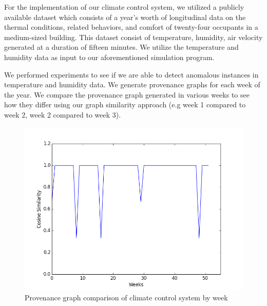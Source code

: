\par For the implementation of our climate control system, we utilized a publicly available dataset \cite{LANGEVIN201594} which consists of a year's worth of longitudinal data on the thermal conditions, related behaviors, and comfort of twenty-four occupants in a medium-sized building. This dataset consist of temperature, humidity, air velocity generated at  a duration of fifteen minutes. We utilize the temperature and humidity data as input to our aforementioned simulation program. \par We performed experiments to see if we are able to detect anomalous instances in temperature and humidity data. We generate provenance graphs for each week of the year. We compare the provenance graph generated in various weeks to see how they differ using our graph similarity approach (e.g week 1 compared to week 2, week 2 compared to week 3). 










\begin{figure}[h!]
\begin{center}
\includegraphics[width=\columnwidth]{figure.png}
\end{center}
\caption{Provenance graph comparison of climate control system by week}
\label{figure}
\end{figure}


